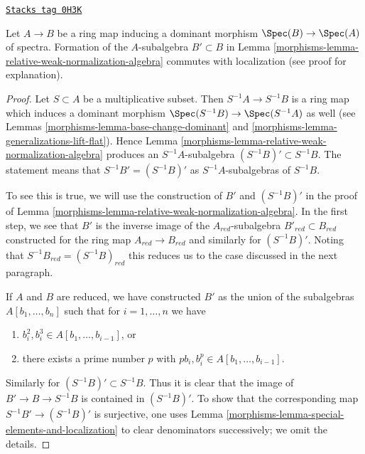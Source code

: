 \begin{lemma}
\label{morphisms-lemma-relative-weak-normalization-localization}
\href{https://stacks.math.columbia.edu/tag/0H3K}{\texttt{Stacks tag 0H3K}}

Let $A \to B$ be a ring map inducing a dominant morphism
$\Spec(B) \to \Spec(A)$ of spectra. Formation of the $A$-subalgebra
$B' \subset B$ in Lemma \ref{morphisms-lemma-relative-weak-normalization-algebra}
commutes with localization (see proof for explanation).
\end{lemma}

\begin{proof}

Let $S \subset A$ be a multiplicative subset. Then $S^{-1}A \to S^{-1}B$ is a
ring map which induces a dominant morphism $\Spec(S^{-1}B) \to \Spec(S^{-1}A)$
as well (see Lemmas \ref{morphisms-lemma-base-change-dominant} and
\ref{morphisms-lemma-generalizations-lift-flat}).
Hence Lemma \ref{morphisms-lemma-relative-weak-normalization-algebra}
produces an $S^{-1}A$-subalgebra $(S^{-1}B)' \subset S^{-1}B$.
The statement means that $S^{-1}B' = (S^{-1}B)'$ as $S^{-1}A$-subalgebras
of $S^{-1}B$.

\medskip\noindent
To see this is true, we will use the construction of $B'$ and
$(S^{-1}B)'$ in the proof of
Lemma \ref{morphisms-lemma-relative-weak-normalization-algebra}.
In the first step, we see that $B'$ is the inverse image of
the $A_{red}$-subalgebra $B'_{red} \subset B_{red}$ constructed
for the ring map $A_{red} \to B_{red}$ and similarly for $(S^{-1}B)'$.
Noting that $S^{-1}B_{red} = (S^{-1}B)_{red}$ this reduces
us to the case discussed in the next paragraph.

\medskip\noindent
If $A$ and $B$ are reduced, we have constructed $B'$ as the union
of the subalgebras $A[b_1, \ldots, b_n]$ such that for $i = 1, \ldots, n$
we have
\begin{enumerate}
\item $b_i^2, b_i^3 \in A[b_1, \ldots, b_{i - 1}]$, or
\item there exists a prime number $p$ with
$pb_i, b_i^p \in A[b_1, \ldots, b_{i - 1}]$.
\end{enumerate}
Similarly for $(S^{-1}B)' \subset S^{-1}B$. Thus it is clear that the
image of $B' \to B \to S^{-1}B$ is contained in $(S^{-1}B)'$.
To show that the corresponding map $S^{-1}B' \to (S^{-1}B)'$
is surjective, one uses Lemma \ref{morphisms-lemma-special-elements-and-localization}
to clear denominators successively; we omit the details.
\end{proof}

